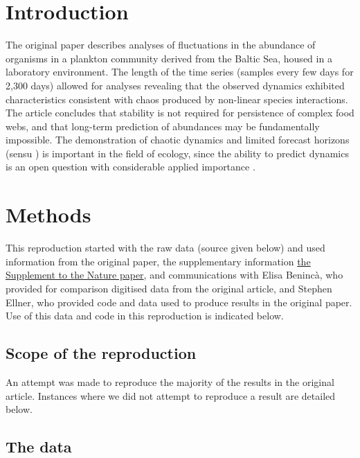\documentclass[10pt,a4paper,onecolumn]{article}
\begin{document}
\section{Introduction}\label{introduction}

The original paper describes analyses of fluctuations in the abundance
of organisms in a plankton community derived from the Baltic Sea, housed
in a laboratory environment. The length of the time series (samples
every few days for 2,300 days) allowed for analyses revealing that the
observed dynamics exhibited characteristics consistent with chaos
produced by non-linear species interactions. The article concludes that
stability is not required for persistence of complex food webs, and that
long-term prediction of abundances may be fundamentally impossible. The
demonstration of chaotic dynamics and limited forecast horizons (sensu
\textcite{Petchey2015}) is important in the field of ecology, since the
ability to predict dynamics is an open question with considerable
applied importance \textcite{Petchey2015} \textcite{Mouquet2015}.

\section{Methods}\label{methods}

This reproduction started with the raw data (source given below) and
used information from the original paper, the supplementary information
\href{http://www.nature.com/nature/journal/v451/n7180/extref/nature06512-s1.pdf}{the
Supplement to the Nature paper}, and communications with Elisa Benincà,
who provided for comparison digitised data from the original article,
and Stephen Ellner, who provided code and data used to produce results
in the original paper. Use of this data and code in this reproduction is
indicated below.

\subsection{Scope of the reproduction}\label{scope-of-the-reproduction}

An attempt was made to reproduce the majority of the results in the
original article. Instances where we did not attempt to reproduce a
result are detailed below.

\subsection{The data}\label{the-data}
\end{document}
